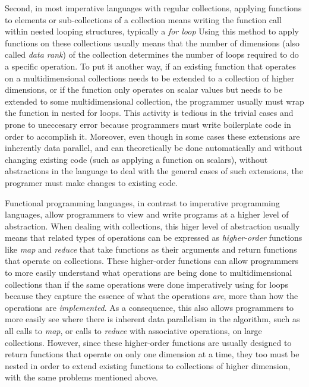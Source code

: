 Second, in most imperative languages with regular collections, applying functions to elements or sub-collections of a collection means writing the function call within nested looping structures, typically a \textit{for loop}
Using this method to apply functions on these collections usually means that the number of dimensions (also called \textit{data rank}) of the collection determines the number of loops required to do a specific operation.
To put it another way, if an existing function that operates on a multidimensional collections needs to be extended to a collection of higher dimensions, 
or if the function only operates on scalar values but needs to be extended to some multidimensional collection, 
the programmer usually must wrap the function in nested for loops.
This activity is tedious in the trivial cases and prone to uneccesary error because programmers must write boilerplate code in order to accomplish it.
Moreover, even though in some cases these extensions are inherently data parallel, and can theoretically be done automatically and without changing existing code (such as applying a function on scalars), 
without abstractions in the language to deal with the general cases of such extensions, the programer must make changes to existing code.

Functional programming languages, in contrast to imperative programming languages, allow programmers to view and write programs at a higher level of abstraction.
When dealing with collections, this higer level of abstraction usually means that related types of operations can be expressed as \textit{higher-order} functions 
like \textit{map} and \textit{reduce} that take functions as their arguments and return functions that operate on collections.
These higher-order functions can allow programmers to more easily understand what operations are being done to multidimensional collections 
than if the same operations were done imperatively using for loops 
because they capture the essence of what the operations \textit{are}, more than how the operations are \textit{implemented}.
As a consequence, this also allows programmers to more easily see where there is inherent data parallelism in the algorithm, such as all calls to \textit{map}, or calls to \textit{reduce} with associative operations, on large collections.
However, since these higher-order functions are usually designed to return functions that operate on only one dimension at a time, 
they too must be nested in order to extend existing functions to collections of higher dimension, with the same problems mentioned above.

